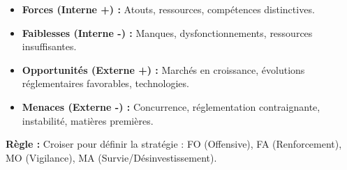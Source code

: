 \documentclass[11pt]{article}
\begin{document}
\begin{methode}
\begin{itemize}
    \item \textbf{Forces (Interne +) :} Atouts, ressources, compétences distinctives.
    \item \textbf{Faiblesses (Interne -) :} Manques, dysfonctionnements, ressources insuffisantes.
    \item \textbf{Opportunités (Externe +) :} Marchés en croissance, évolutions réglementaires favorables, technologies.
    \item \textbf{Menaces (Externe -) :} Concurrence, réglementation contraignante, instabilité, matières premières.
\end{itemize}
\textbf{Règle :} Croiser pour définir la stratégie : FO (Offensive), FA (Renforcement), MO (Vigilance), MA (Survie/Désinvestissement).
\end{methode}
\end{document}
